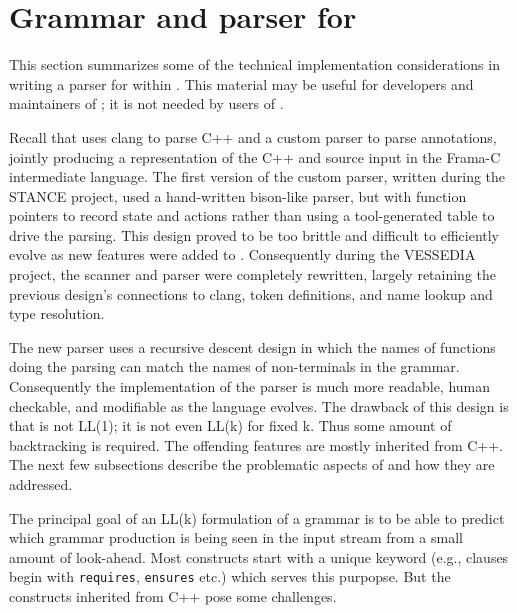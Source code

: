 \newcommand{\lang}{C++\xspace}
\chapter{Grammar and parser for \acslpp}
\label{sec:grammar}

This section summarizes some of the technical implementation considerations in writing a parser for \acslpp within \fclang. 
This material may be useful for developers and maintainers of \fclang; it is not needed by users of \fclang.

Recall that \fclang uses clang to parse \lang and a custom parser to parse \acslpp annotations, jointly producing a representation of the \lang and \acslpp source input in the Frama-C intermediate language. 
The first version of the \acslpp custom parser, written during the STANCE project, used a hand-written bison-like parser, but with function pointers to record state and actions rather than using a tool-generated table to drive the parsing. 
This design proved to be too brittle and difficult to efficiently evolve as new features were added to \acslpp. 
Consequently during the VESSEDIA project, the scanner and parser were completely rewritten, largely retaining the previous design's connections to clang, token definitions, and name lookup and type resolution.

The new parser uses a recursive descent design in which the names of functions doing the parsing can match the names of non-terminals in the grammar. 
Consequently the implementation of the parser is much more readable, human checkable, and modifiable as the \acslpp language evolves. 
The drawback of this design is that \acslpp is not LL(1); it is not even LL(k) for fixed k. 
Thus some amount of backtracking is required. The offending features are mostly inherited from \lang. 
The next few subsections describe the problematic aspects of \acslpp and how they are addressed.

The principal goal of an LL(k) formulation of a grammar is to be able to predict which grammar production is being seen in the input stream from a small amount of look-ahead.
Most \acslpp constructs start with a unique keyword (e.g., clauses begin with \lstinline|requires|, \lstinline|ensures| etc.) which serves this purpopse. 
But the constructs inherited from \lang pose some challenges.

